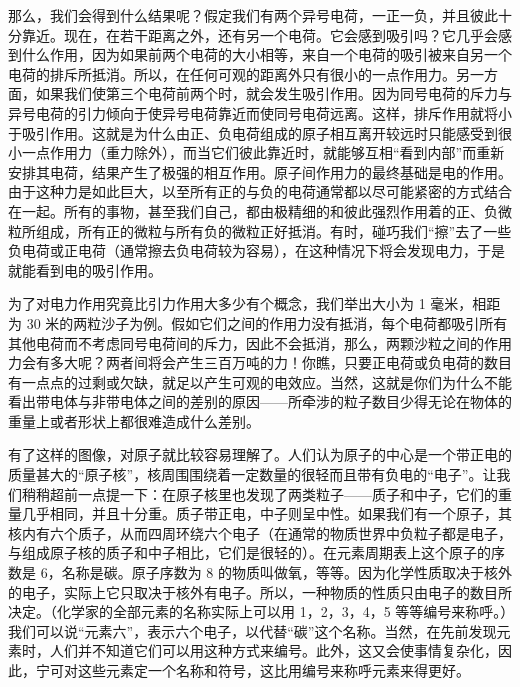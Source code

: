 \documentclass[12pt,oneside]{book}
\begin{document}
\begin{common-format}
那么，我们会得到什么结果呢？假定我们有两个异号电荷，一正一负，并且彼此十分靠近。现在，在若干距离之外，还有另一个电荷。它会感到吸引吗？它几乎会感到什么作用，因为如果前两个电荷的大小相等，来自一个电荷的吸引被来自另一个电荷的排斥所抵消。所以，在任何可观的距离外只有很小的一点作用力。另一方面，如果我们使第三个电荷前两个时，就会发生吸引作用。因为同号电荷的斥力与异号电荷的引力倾向于使异号电荷靠近而使同号电荷远离。这样，排斥作用就将小于吸引作用。这就是为什么由正、负电荷组成的原子相互离开较远时只能感受到很小一点作用力（重力除外），而当它们彼此靠近时，就能够互相“看到内部”而重新安排其电荷，结果产生了极强的相互作用。原子间作用力的最终基础是电的作用。由于这种力是如此巨大，以至所有正的与负的电荷通常都以尽可能紧密的方式结合在一起。所有的事物，甚至我们自己，都由极精细的和彼此强烈作用着的正、负微粒所组成，所有正的微粒与所有负的微粒正好抵消。有时，碰巧我们“擦”去了一些负电荷或正电荷（通常擦去负电荷较为容易），在这种情况下将会发现电力，于是就能看到电的吸引作用。

为了对电力作用究竟比引力作用大多少有个概念，我们举出大小为 1 毫米，相距为 30 米的两粒沙子为例。假如它们之间的作用力没有抵消，每个电荷都吸引所有其他电荷而不考虑同号电荷间的斥力，因此不会抵消，那么，两颗沙粒之间的作用力会有多大呢？两者间将会产生三百万吨的力！你瞧，只要正电荷或负电荷的数目有一点点的过剩或欠缺，就足以产生可观的电效应。当然，这就是你们为什么不能看出带电体与非带电体之间的差别的原因——所牵涉的粒子数目少得无论在物体的重量上或者形状上都很难造成什么差别。

有了这样的图像，对原子就比较容易理解了。人们认为原子的中心是一个带正电的质量甚大的“原子核”，核周围围绕着一定数量的很轻而且带有负电的“电子”。让我们稍稍超前一点提一下：在原子核里也发现了两类粒子——质子和中子，它们的重量几乎相同，并且十分重。质子带正电，中子则呈中性。如果我们有一个原子，其核内有六个质子，从而四周环绕六个电子（在通常的物质世界中负粒子都是电子，与组成原子核的质子和中子相比，它们是很轻的）。在元素周期表上这个原子的序数是 6，名称是碳。原子序数为 8 的物质叫做氧，等等。因为化学性质取决于核外的电子，实际上它只取决于核外有电子。所以，一种物质的性质只由电子的数目所决定。（化学家的全部元素的名称实际上可以用 1，2，3，4，5 等等编号来称呼。）我们可以说“元素六”，表示六个电子，以代替“碳”这个名称。当然，在先前发现元素时，人们并不知道它们可以用这种方式来编号。此外，这又会使事情复杂化，因此，宁可对这些元素定一个名称和符号，这比用编号来称呼元素来得更好。


\end{common-format}
\end{document}
